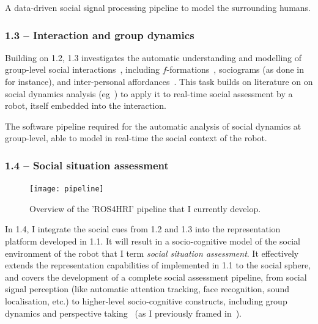 \begin{outcome}{1.2}
A data-driven social signal processing
    pipeline to model the surrounding humans.
\end{outcome}

\subsubsection{1.3 -- Interaction and group dynamics}

Building on 1.2, 1.3
investigates the automatic understanding and modelling of group-level social
interactions~\parencite{tapus2019perceiving}, including
$f$-formations~\parencite{marshall2011using}, sociograms (as done
in~\parencite{garcia2016hybrid} for instance), and inter-personal
affordances~\parencite{pandey2013affordance}. This task builds on literature on on
social dynamics analysis (eg~\parencite{durantin2017social,jermann2009physical,
martinez2019collocated}) to apply it to real-time social assessment by a robot,
itself embedded into the interaction.

\begin{outcome}{1.3}
The software pipeline required for the automatic analysis of social
    dynamics at group-level, able to model in real-time the social context
    of the robot.
\end{outcome}


\subsubsection{1.4 -- Social situation assessment}

\begin{figure}
    \centering
    \texttt{[image: pipeline]}
    \caption{Overview of the 'ROS4HRI' pipeline that I currently develop.}
    \label{fig:ros4hri}
\end{figure}

In 1.4, I integrate the social
cues from 1.2 and 1.3 into the representation platform developed in 1.1. It will
result in a socio-cognitive model of the social environment of the robot that I
term \emph{social situation assessment}. It effectively extends the
representation capabilities of implemented in 1.1 to the social sphere, and covers the
development of a complete social assessment pipeline, from social signal
perception (like automatic attention tracking, face recognition, sound
localisation, etc.) to higher-level socio-cognitive constructs, including group
dynamics and perspective taking~\parencite{flavell1992perspectives} (as I previously
framed in~\parencite{lemaignan2015mutual, dillenbourg2016symmetry}).

